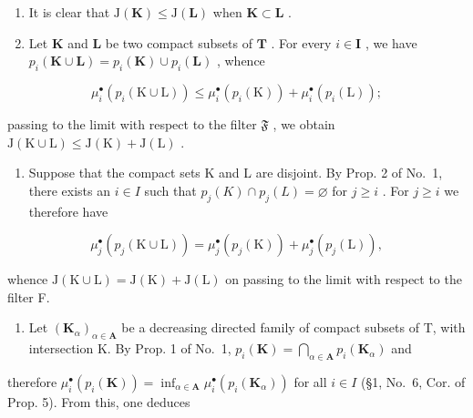 \begin{enumerate}
\def\labelenumi{\arabic{enumi})}
\item
  It is clear that \(\mathrm{J}(\mathbf{K})\leqslant \mathrm{J}(\mathbf{L})\) when \(\mathbf{K}\subset \mathbf{L}\) .
\item
  Let \(\mathbf{K}\) and \(\mathbf{L}\) be two compact subsets of \(\mathbf{T}\) . For every \(i \in \mathbf{I}\) , we have \(p_i(\mathbf{K} \cup \mathbf{L}) = p_i(\mathbf{K}) \cup p_i(\mathbf{L})\) , whence
\end{enumerate}

\[
\mu_ {i} ^ {\bullet} \left(p _ {i} (\mathrm{K} \cup \mathrm{L})\right) \leqslant \mu_ {i} ^ {\bullet} \left(p _ {i} (\mathrm{K})\right) + \mu_ {i} ^ {\bullet} \left(p _ {i} (\mathrm{L})\right);
\]

passing to the limit with respect to the filter \(\mathfrak{F}\) , we obtain \(\mathrm{J}(\mathrm{K} \cup \mathrm{L}) \leqslant \mathrm{J}(\mathrm{K}) + \mathrm{J}(\mathrm{L})\) .

\begin{enumerate}
\def\labelenumi{\arabic{enumi})}
\setcounter{enumi}{2}
\tightlist
\item
  Suppose that the compact sets K and L are disjoint. By Prop. 2 of No.~1, there exists an \(i \in I\) such that \(p_j(K) \cap p_j(L) = \varnothing\) for \(j \geqslant i\) . For \(j \geqslant i\) we therefore have
\end{enumerate}

\[
\mu_ {j} ^ {\bullet} \left(p _ {j} (\mathrm{K} \cup \mathrm{L})\right) = \mu_ {j} ^ {\bullet} \left(p _ {j} (\mathrm{K})\right) + \mu_ {j} ^ {\bullet} \left(p _ {j} (\mathrm{L})\right),
\]

whence \(\mathrm{J}(\mathrm{K}\cup\mathrm{L})=\mathrm{J}(\mathrm{K})+\mathrm{J}(\mathrm{L})\) on passing to the limit with respect to the filter F.

\begin{enumerate}
\def\labelenumi{\arabic{enumi})}
\setcounter{enumi}{3}
\tightlist
\item
  Let \((\mathbf{K}_{\alpha})_{\alpha \in \mathbf{A}}\) be a decreasing directed family of compact subsets of T, with intersection K. By Prop. 1 of No.~1, \(p_i(\mathbf{K}) = \bigcap_{\alpha \in \mathbf{A}} p_i(\mathbf{K}_{\alpha})\) and
\end{enumerate}

therefore \(\mu_i^\bullet (p_i(\mathbf{K})) = \inf_{\alpha \in \mathbf{A}}\mu_i^\bullet (p_i(\mathbf{K}_\alpha))\) for all \(i\in I\) (§1, No.~6, Cor. of Prop. 5). From this, one deduces

